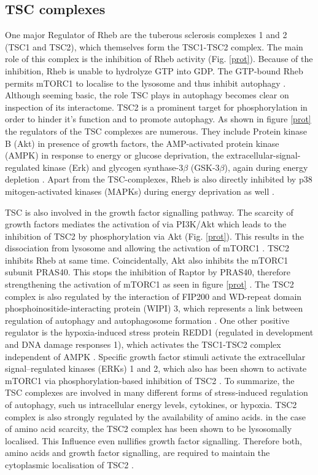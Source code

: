 \documentclass[12pt]{article} %
\begin{document}
\begin{linenumbers*}
\subsection{TSC complexes}
One major Regulator of Rheb are the tuberous sclerosis complexes 1 and 2 (TSC1 and TSC2), which themselves form the TSC1-TSC2 complex. The main role of this complex is the inhibition of Rheb activity (Fig. \ref{prot}). Because of the inhibition, Rheb is unable to hydrolyze GTP into GDP. The GTP-bound Rheb permits mTORC1 to localise to the lysosome and thus inhibit autophagy
\citep{Dikic2018}.
Although seeming basic, the role TSC plays in autophagy becomes clear on inspection of its interactome. TSC2 is a prominent target for phosphorylation in order to hinder it's function and to promote autophagy. As shown in figure  \ref{prot} the regulators of the TSC complexes are numerous. They include Protein kinase B (Akt) in presence of growth factors, the AMP-activated protein kinase (AMPK) in response to energy or glucose deprivation, the extracellular-signal-regulated kinase (Erk) and  glycogen synthase-3$\beta$ (GSK-3$\beta$), again during energy depletion \citep{RabanalRuiz2017}. Apart from the TSC-complexes, Rheb is also directly inhibited by p38 mitogen-activated kinases (MAPKs) during energy deprivation as well \citep{Sciarretta2018}.

TSC is also involved in the growth factor signalling pathway. The scarcity of growth factors mediates the activation of via PI3K/Akt which leads to the inhibition of TSC2 by phosphorylation via Akt (Fig. \ref{prot}). This results in the dissociation from lysosome and allowing the activation of mTORC1  \citep{Dikic2018}. TSC2 inhibits Rheb at same time. Coincidentally, Akt also inhibits the mTORC1 subunit PRAS40. This stops the inhibition of Raptor by PRAS40, therefore strengthening the activation of mTORC1 as seen in figure \ref{prot} \citep{RabanalRuiz2018}.
The TSC2 complex is also regulated by the interaction of FIP200 and WD-repeat domain phosphoinositide-interacting protein (WIPI) 3, which represents a link between regulation of autophagy and autophagosome formation \citep{Dikic2018}.
One other positive regulator is the hypoxia-induced stress protein REDD1 (regulated in development and DNA damage responses 1), which activates the TSC1-TSC2 complex independent of AMPK \citep{Dikic2018, RabanalRuiz2018}.
Specific growth factor stimuli activate the extracellular signal–regulated kinases (ERKs) 1 and 2, which also has been shown to activate mTORC1 via phosphorylation-based inhibition of TSC2 \citep{Huang2008}.
To summarize, the TSC complexes are involved in many different forms of stress-induced regulation of autophagy, such us intracellular energy levels, cytokines, or hypoxia.
TSC2 complex is also strongly regulated by the availability of amino acids. in the case of amino acid scarcity, the TSC2 complex has been shown to be lysosomally localised. This Influence even nullifies growth factor signalling. Therefore both, amino acids and growth factor signalling, are required to maintain the cytoplasmic localisation of TSC2
\citep{RabanalRuiz2018}. 


\end{linenumbers*}
\end{document}

